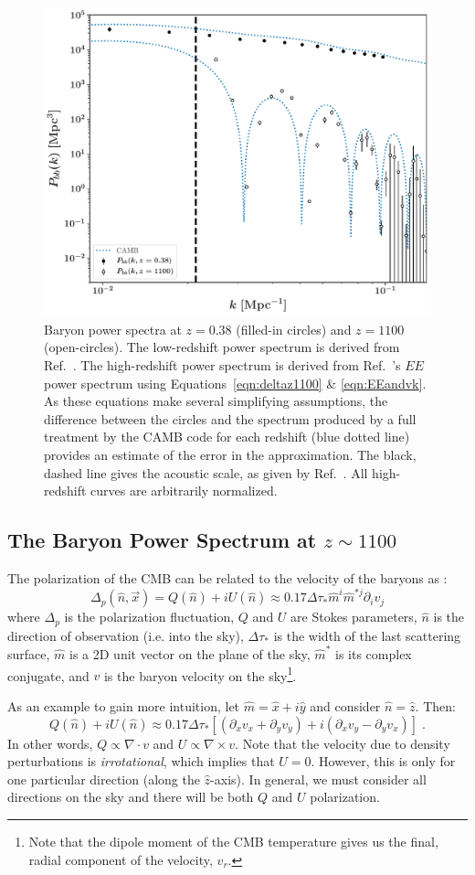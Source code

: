 \documentclass[12pt,floats,floatfix,showpacs,amssymb,amsmath,prl,superscriptaddress,nofootinbib, aps]{revtex4-2}
\begin{document}
\begin{figure}[!htb]
    \centering
    \includegraphics[width=.48\textwidth]{power_spectra.pdf}
    \caption{\label{fig:ps} Baryon power spectra at $z=0.38$ (filled-in circles) and $z=1100$ (open-circles). The low-redshift power spectrum is derived from Ref.~\cite{Beutler2016}. The high-redshift power spectrum is derived from Ref.~\cite{Planck2019}'s $EE$ power spectrum using Equations~\ref{eqn:deltaz1100} \& \ref{eqn:EEandvk}. As these equations make several simplifying assumptions, the difference between the circles and the spectrum produced by a full treatment by the CAMB code for each redshift (blue dotted line) provides an estimate of the error in the approximation. The black, dashed line gives the acoustic scale, as given by Ref.~\cite{Planck2018}. All high-redshift curves are arbitrarily normalized.}
\end{figure} 

\subsection{The Baryon Power Spectrum at ${z\sim1100}$}

The polarization of the CMB can be related to the velocity of the baryons as \citep{Zaldarriaga1997}:
\begin{equation}\label{eqn:QU}
\Delta_p(\hat n, \vec{x}) = Q(\hat n) +iU(\hat n) \approx 0.17 \Delta \tau_* \hat m^i \hat m^{*j} \partial_i v_{j}
\end{equation}
where $\Delta_p$ is the polarization fluctuation, $Q$ and $U$ are Stokes parameters, $\hat{n}$ is the direction of observation (i.e. into the sky), $\Delta \tau_{*}$ is the width of the last scattering surface, $\hat{m}$ is a 2D unit vector on the plane of the sky, $\hat{m}^*$ is its complex conjugate, and $v$ is the baryon velocity on the sky\footnote{Note that the dipole moment of the CMB temperature gives us the final, radial component of the velocity, $v_r$.}. 

As an example to gain more intuition, let $\hat{m} = \hat{x} + i\hat{y}$ and consider $\hat{n} = \hat{z}$. Then:
\begin{equation}
    Q(\hat n) +iU(\hat n) \approx 0.17 \Delta \tau_*\left[ (\partial_x v_x + \partial_y v_y) + i(\partial_x v_y - \partial_y v_x)\right] \; .
\end{equation}
In other words, $Q \propto \nabla \cdot v$ and $U \propto \nabla \times v$. Note that the velocity due to density perturbations is \textit{irrotational}, which implies that $U = 0$. However, this is only for one particular direction (along the $\hat{z}$-axis). In general, we must consider all directions on the sky and there will be both $Q$ and $U$ polarization.
\end{document}
